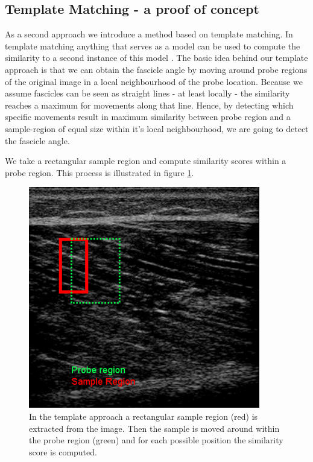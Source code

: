 \documentclass[10pt,twocolumn,letterpaper]{article}
\begin{document}
\subsection{Template Matching - a proof of concept}
As a second approach we introduce a method based on template matching. In template matching anything that serves as a model can be used to compute the similarity to a second instance of this model \cite{Brunelli09a}. The basic idea behind our template approach is that we can obtain the fascicle angle by moving around probe regions of the original image in a local neighbourhood of the probe location. Because we assume fascicles can be seen as straight lines - at least locally - the similarity reaches a maximum for movements along that line. Hence, by detecting which specific movements result in maximum similarity between probe region and a sample-region of equal size within it's local neighbourhood, we are going to detect the fascicle angle.


We take a rectangular sample region and compute similarity scores within a probe region. This process is illustrated in figure \ref{fig:templateApproach}. 

\begin{figure}
	\begin{center}		
		\includegraphics[width=0.7\linewidth]{img/templateApproach}
	\end{center}
	\caption{In the template approach a rectangular sample region (red) is extracted from the image. Then the sample is moved around within the probe region (green) and for each possible position the similarity score is computed.}
	\label{fig:templateApproach}
	
\end{figure}
\end{document}
